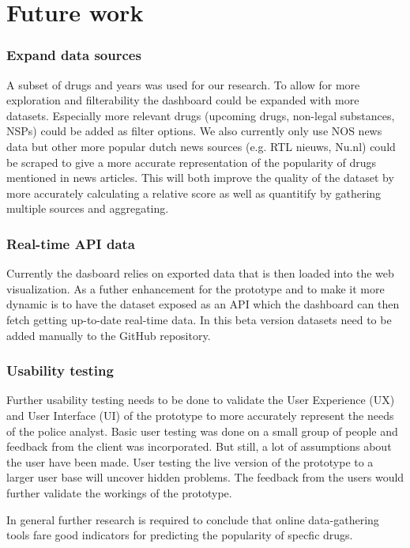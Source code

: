 \section{Future work}

\subsubsection{Expand data sources}
A subset of drugs and years was used for our research. To allow for more exploration and filterability the dashboard could be expanded with more datasets. Especially more relevant drugs (upcoming drugs, non-legal substances, NSPs) could be added as filter options. We also currently only use NOS news data but other more popular dutch news sources (e.g. RTL nieuws, Nu.nl) could be scraped to give a more accurate representation of the popularity of drugs mentioned in news articles. This will both improve the quality of the dataset by more accurately calculating a relative score as well as quantitify by gathering multiple sources and aggregating.

\subsubsection{Real-time API data}
Currently the dasboard relies on exported data that is then loaded into the web visualization. As a futher enhancement for the prototype and to make it more dynamic is to have the dataset exposed as an API which the dashboard can then fetch getting up-to-date real-time data. In this beta version datasets need to be added manually to the GitHub repository.

\subsubsection{Usability testing}
Further usability testing needs to be done to validate the User Experience (UX) and User Interface (UI) of the prototype to more accurately represent the needs of the police analyst. Basic user testing was done on a small group of people and feedback from the client was incorporated. But still, a lot of assumptions about the user have been made. User testing the live version of the prototype to a larger user base will uncover hidden problems. The feedback from the users would further validate the workings of the prototype.

In general further research is required to conclude that online data-gathering tools fare good indicators for predicting the popularity of specfic drugs.